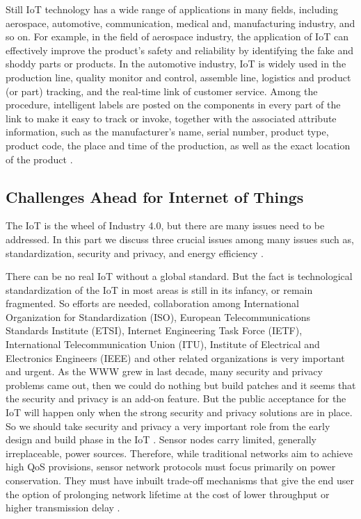 {Still \acs{IoT} technology has a wide range of applications in many fields, including aerospace, automotive, communication, medical and, manufacturing industry, and so on. For example, in the field of aerospace industry, the application of \acs{IoT} can effectively improve the product’s safety and reliability by identifying the fake and shoddy parts or products. In the automotive industry, IoT is widely used in the production line, quality monitor and control, assemble line, logistics and product (or part) tracking, and the real-time link of customer service. Among the procedure, intelligent labels are posted on the components in every part of the link to make it easy to track or invoke, together with the associated attribute information, such as the manufacturer’s name, serial number, product type, product code, the place and time of the production, as well as the exact location of the product \cite{IOTCLOUD,CONAWAREIOT}.

\subsection{Challenges Ahead for Internet of Things} \label{smartfactory}
The \acs{IoT} is the wheel of Industry 4.0, but there are many issues need to be addressed. In this part we discuss three crucial issues among many issues such as, standardization, security and privacy, and energy efficiency \cite{IOTFUTURE,IOTGUBBI}.

There can be no real \acs{IoT} without a global standard. But the fact is technological standardization of the \acs{IoT} in most areas is still in its infancy, or remain fragmented. So efforts are needed, collaboration among International Organization for Standardization (\acs{ISO}), European Telecommunications Standards Institute (\acs{ETSI}), Internet Engineering Task Force (\acs{IETF}), International Telecommunication Union (\acs{ITU}), Institute of Electrical and Electronics Engineers (\acs{IEEE}) and other related organizations is very important and urgent. As the \acs{WWW} grew in last decade, many security and privacy problems came out, then we could do nothing but build patches and it seems that the security and privacy is an add-on feature. But the public acceptance for the \acs{IoT} will happen only when the strong security and privacy solutions are in place. So we should take security and privacy a very important role from the early design and build phase in the \acs{IoT} \cite{IOTFUTURE}. Sensor nodes carry limited, generally irreplaceable, power sources. Therefore, while traditional networks aim to achieve high \acs{QoS} provisions, sensor network protocols must focus primarily on power conservation. They must have inbuilt trade-off mechanisms that give the end user the option of prolonging network lifetime at the cost of lower throughput or higher transmission delay \cite{WSNSURVEY}.

}
